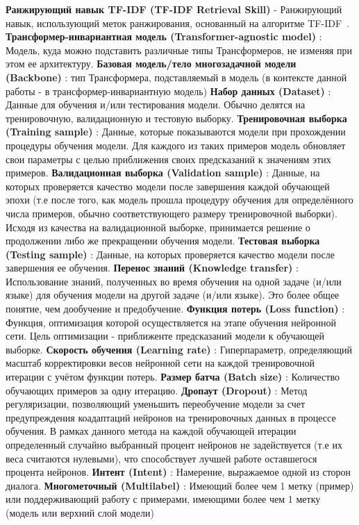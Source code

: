 \textbf{Ранжирующий навык TF-IDF (TF-IDF Retrieval Skill)} - Ранжирующий навык, использующий меток ранжирования, основанный на алгоритме TF-IDF~\cite{tfidf}. 
\textbf{Трансформер-инвариантная модель (Transformer-agnostic model)} : Модель, куда можно подставить различные типы Трансформеров, не  изменяя при этом ее архитектуру.
\textbf{Базовая модель/тело многозадачной модели (Backbone)} : тип Трансформера, подставляемый в модель (в контексте данной работы - в трансформер-инвариантную модель)
\textbf{Набор данных (Dataset)} : Данные для обучения и/или тестирования модели. Обычно делятся на тренировочную, валидационную и тестовую выборку. 
\textbf{Тренировочная выборка (Training sample)} : Данные, которые показываются модели при прохождении процедуры обучения модели. Для каждого из таких примеров модель обновляет свои параметры с целью приближения своих предсказаний к значениям этих примеров.
\textbf{Валидационная выборка (Validation sample)} : Данные, на которых проверяется качество модели после завершения каждой обучающей эпохи (т.е после того, как модель прошла процедуру обучения для определённого числа примеров, обычно соответствующего размеру тренировочной выборки). Исходя из качества на валидационной выборке, принимается решение о продолжении либо же прекращении обучения модели.
\textbf{Тестовая выборка (Testing sample)} : Данные, на которых проверяется качество модели после завершения ее обучения.
\textbf{Перенос знаний (Knowledge transfer)} : Использование знаний, полученных во время обучения на одной задаче (и/или языке) для обучения модели на другой задаче (и/или языке). Это более общее понятие, чем дообучение и предобучение.
\textbf{Функция потерь (Loss function)} : Функция, оптимизация которой осуществляется на этапе обучения нейронной сети. Цель оптимизации - приближенте предсказаний модели к обучающей выборке.
\textbf{Скорость обучения (Learning rate)} : Гиперпараметр, определяющий масштаб корректировки весов нейронной сети на каждой тренировочной итерации с учётом функции потерь.
\textbf{Размер батча (Batch size)} : Количество обучающих примеров за одну итерацию.
\textbf{Дропаут (Dropout)} : Метод регуляризации, позволяющий уменьшить переобучение модели за счет предупреждения коадаптаций нейронов на тренировочных данных в процессе обучения. В рамках данного метода на каждой обучающей итерации определенный случайно выбранный процент нейронов не задействуется (т.е их веса считаются нулевыми), что способствует лучшей работе оставшегося процента нейронов. 
\textbf{Интент (Intent)} : Намерение, выражаемое одной из сторон диалога.
\textbf{Многометочный (Multilabel)} : Имеющий более чем 1 метку (пример) или поддерживающий работу с примерами, имеющими более чем 1 метку (модель или верхний слой модели)
